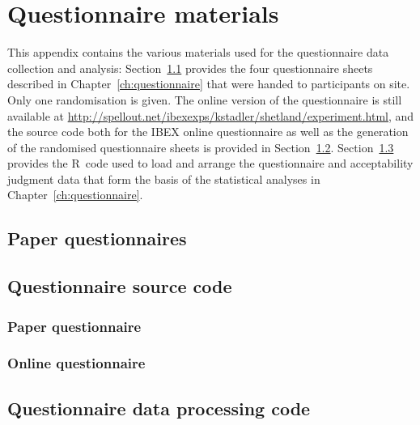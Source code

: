 \documentclass[oneside]{book}
\newcommand{\includeR}[1]{}
\begin{document}
\chapter{Questionnaire materials}
\label{app:questionnaire}
This appendix contains the various materials used for the questionnaire data collection and analysis: Section~\ref{app:paperquestionnaire} provides the four questionnaire sheets described in Chapter~\ref{ch:questionnaire} that were handed to participants on site. Only one randomisation is given. The online version of the questionnaire is still available at \url{http://spellout.net/ibexexps/kstadler/shetland/experiment.html}, and the source code both for the IBEX online questionnaire as well as the generation of the randomised questionnaire sheets is provided in Section~\ref{app:questionnairecode}.
Section~\ref{app:questionnairedatacode} provides the R~code used to load and arrange the questionnaire and acceptability judgment data that form the basis of the statistical analyses in Chapter~\ref{ch:questionnaire}.

\section{Paper questionnaires}
\label{app:paperquestionnaire}
%
\section{Questionnaire source code}
\label{app:questionnairecode}
\subsection{Paper questionnaire}

\includeR{../momentum/questionnaire/shetland/questionnaire.Rmd}
\subsection{Online questionnaire}


\section{Questionnaire data processing code}
\label{app:questionnairedatacode}

\includeR{questionnaire/shetland-data.R}
\end{document}
